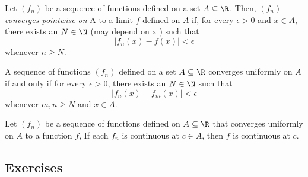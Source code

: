 \begin{tcolorbox}
    \begin{defn}
    Let \( (f_n)  \) be a sequence of functions defined on a set \( A \subseteq \R  \). Then, \( (f_n)  \) \textit{converges pointwise on} A to a limit \( f  \) defined on \( A  \) if, for every \( \epsilon > 0   \) and \( x \in A  \), there exists an \( N \in \N  \) (may depend on x ) such that 
    \[  | f_n(x) - f(x)  | < \epsilon  \] whenever \( n \geq N  \).
    \end{defn}
\end{tcolorbox}


\begin{tcolorbox}
    \begin{thm}
    A sequence of functions \( (f_n)  \) defined on a set \( A \subseteq \R  \) converges uniformly on \( A  \) if and only if for every \( \epsilon > 0  \), there exists an \( N \in \N  \) such that 
    \[  | f_n(x) - f_m(x)  | < \epsilon  \]
    whenever \( m,n \geq N  \) and \( x \in A  \).
    \end{thm}
\end{tcolorbox}


\begin{tcolorbox}
    \begin{thm}
    Let \( (f_n)  \) be a sequence of functions defined on \( A \subseteq \R  \) that converges uniformly on \( A  \) to a function \( f  \), If each \( f_n   \) is continuous at \( c \in A  \), then \( f  \) is continuous at \( c  \).
    \end{thm}
\end{tcolorbox}



\subsection{Exercises}

